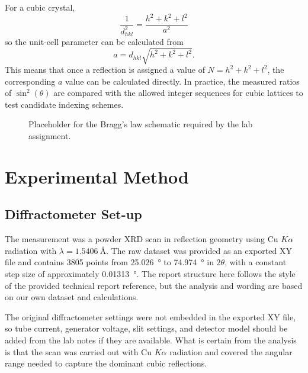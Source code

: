 \documentclass[11pt,a4paper]{article}
\begin{document}
For a cubic crystal,
\begin{equation}
  \frac{1}{d_{hkl}^2} = \frac{h^2+k^2+l^2}{a^2}
\end{equation}
so the unit-cell parameter can be calculated from
\begin{equation}
  a = d_{hkl}\sqrt{h^2+k^2+l^2}.
\end{equation}
This means that once a reflection is assigned a value of $N = h^2 + k^2 + l^2$, the corresponding $a$ value can be calculated directly. In practice, the measured ratios of $\sin^2(\theta)$ are compared with the allowed integer sequences for cubic lattices to test candidate indexing schemes.

\begin{figure}[H]
  \centering
  \caption{Placeholder for the Bragg's law schematic required by the lab assignment.}
  \label{fig:bragg-placeholder}
\end{figure}

\section{Experimental Method}
\subsection{Diffractometer Set-up}
The measurement was a powder XRD scan in reflection geometry using Cu $K\alpha$ radiation with $\lambda = \SI{1.5406}{\angstrom}$. The raw dataset was provided as an exported XY file and contains \num{3805} points from \SI{25.026}{\degree} to \SI{74.974}{\degree} in $2\theta$, with a constant step size of approximately \SI{0.01313}{\degree}. The report structure here follows the style of the provided technical report reference, but the analysis and wording are based on our own dataset and calculations.

The original diffractometer settings were not embedded in the exported XY file, so tube current, generator voltage, slit settings, and detector model should be added from the lab notes if they are available. What is certain from the analysis is that the scan was carried out with Cu $K\alpha$ radiation and covered the angular range needed to capture the dominant cubic reflections.
\end{document}
